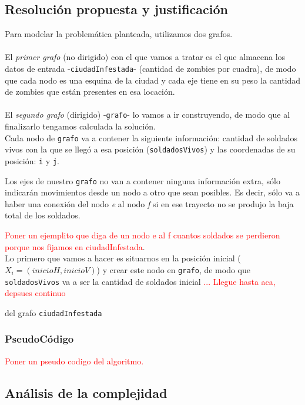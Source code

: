 \newpage
\subsection{Resoluci\'on propuesta y justificaci\'on}

Para modelar la problem\'atica planteada, utilizamos dos grafos.\\
\\

El \emph{primer grafo} (no dirigido) con el que vamos a tratar es el que almacena los datos de entrada -\texttt{ciudadInfestada}- (cantidad de zombies por cuadra), de modo que cada nodo es una esquina de la ciudad y cada eje tiene en su peso la cantidad de zombies que est\'an presentes en esa locaci\'on.\\
\\

El \emph{segundo grafo} (dirigido) -\texttt{grafo}- lo vamos a ir construyendo, de modo que al finalizarlo tengamos calculada la soluci\'on.\\

Cada nodo de \texttt{grafo} va a contener la siguiente informaci\'on: cantidad de soldados vivos con la que se lleg\'o a esa posici\'on (\texttt{soldadosVivos}) y las coordenadas de su posici\'on: \texttt{i} y \texttt{j}.

Los ejes de nuestro \texttt{grafo} no van a contener ninguna informaci\'on extra, s\'olo indicar\'an movimientos desde un nodo a otro que sean posibles. Es decir, s\'olo va a haber una conexi\'on del nodo \emph{e} al nodo \emph{f} si en ese trayecto no se produjo la baja total de los soldados.

\textcolor{red}{Poner un ejemplito que diga de un nodo e al f cuantos soldados se perdieron porque nos fijamos en ciudadInfestada}.\\



Lo primero que vamos a hacer es situarnos en la posici\'on inicial ($X_i = (inicioH, inicioV)$) y crear este nodo en \texttt{grafo}, de modo que \texttt{soldadosVivos} va a ser la cantidad de soldados inicial \textcolor{red}{... Llegue hasta aca, depsues continuo}


del grafo \texttt{ciudadInfestada}


\subsubsection*{PseudoC\'odigo}
\textcolor{red}{Poner un pseudo codigo del algoritmo.}
\subsection{An\'alisis de la complejidad}

